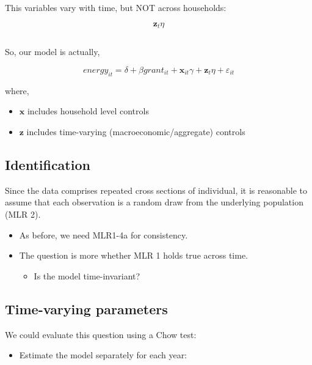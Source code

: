 \documentclass[
  letterpaper,
  DIV=11,
  numbers=noendperiod]{scrartcl}
\providecommand{\tightlist}{%
  \setlength{\itemsep}{0pt}\setlength{\parskip}{0pt}}
\begin{document}
This variables vary with time, but NOT across households:

\[
  \mathbf{z}_t\eta
\]

\subsection{}\label{section}

So, our model is actually,

\[
  energy_{it} = \delta + \beta grant_{it} + \mathbf{x}_{it}\gamma + \mathbf{z}_t\eta + \varepsilon_{it}
\]

where,

\begin{itemize}
\item
  \(\mathbf{x}\) includes household level controls
\item
  \(\mathbf{z}\) includes time-varying (macroeconomic/aggregate)
  controls
\end{itemize}

\subsection{Identification}\label{identification}

Since the data comprises repeated cross sections of individual, it is
reasonable to assume that each observation is a random draw from the
underlying population (MLR 2).

\hfill\break

\begin{itemize}
\item
  As before, we need MLR1-4a for consistency.
\item
  The question is more whether MLR 1 holds true across time.

  \begin{itemize}
  \tightlist
  \item
    Is the model time-invariant?
  \end{itemize}
\end{itemize}

\subsection{Time-varying parameters}\label{time-varying-parameters}

We could evaluate this question using a Chow test:

\begin{itemize}
\tightlist
\item
  Estimate the model separately for each year:
\end{itemize}
\end{document}
